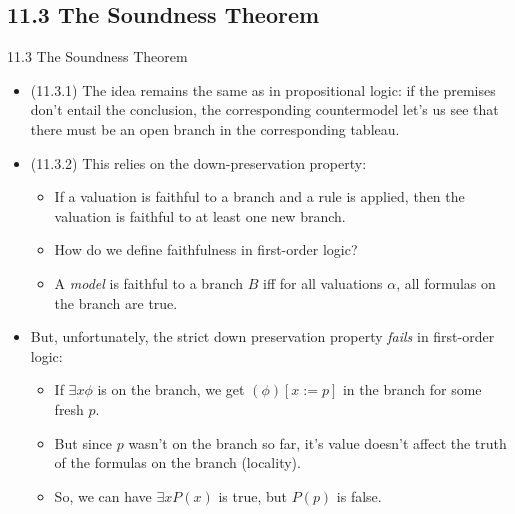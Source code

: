 \documentclass[../slides.tex]{subfiles}
\begin{document}
\subsection{11.3 The Soundness Theorem}

\begin{frame}{11.3 The Soundness Theorem}

  \begin{itemize}
  \item (11.3.1) The idea remains the same as in propositional logic:
    if the premises don't entail the conclusion, the corresponding
    countermodel let's us see that there must be an open branch in the
    corresponding tableau.

  \item (11.3.2) This relies on the down-preservation property:

    \begin{itemize}
    \item If a valuation is faithful to a branch and a rule is
      applied, then the valuation is faithful to at least one new
      branch.
    \item How do we define faithfulness in first-order logic?

      \item A \emph{model} is faithful to a branch $B$ iff for all
        valuations $\alpha$, all formulas on the branch are true.
    \end{itemize}

    \item But, unfortunately, the strict down preservation property
      \emph{fails} in first-order logic:
      \begin{itemize}
      \item If $\exists x\phi$ is on the branch, we get $(\phi)[x:=p]$
        in the branch for some fresh $p$.

      \item But since $p$ wasn't on the branch so far, it's value
        doesn't affect the truth of the formulas on the branch
        (locality).
        \item So, we can have $\exists xP(x)$ is true, but $P(p)$ is false.
      \end{itemize}
  \end{itemize}
  
\end{frame}
\end{document}
